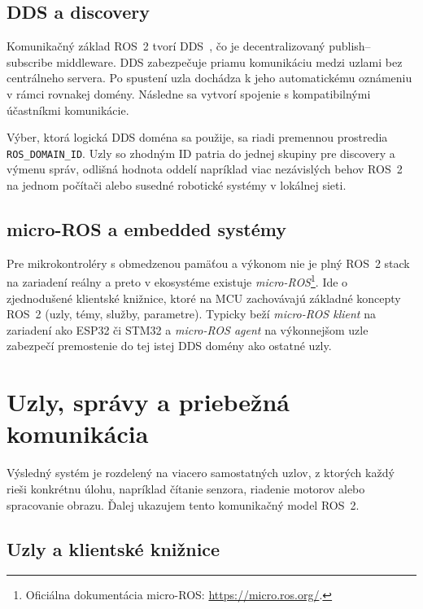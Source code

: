         \subsection*{DDS a discovery}
      
        Komunikačný základ ROS~2 tvorí DDS~\cite{dds_foundation_what_is_dds}, čo je decentralizovaný publish--subscribe middleware. DDS zabezpečuje priamu komunikáciu medzi uzlami bez centrálneho servera. Po spustení uzla dochádza k jeho automatickému oznámeniu v rámci rovnakej domény. Následne sa vytvorí spojenie s kompatibilnými účastníkmi komunikácie.
      
        Výber, ktorá logická DDS doména sa použije, sa riadi premennou prostredia \texttt{ROS\_DOMAIN\_ID}. Uzly so zhodným ID patria do jednej skupiny pre discovery a výmenu správ, odlišná hodnota oddelí napríklad viac nezávislých behov ROS~2 na jednom počítači alebo susedné robotické systémy v lokálnej sieti.
      
        \subsection*{micro-ROS a embedded systémy}
      

        Pre mikrokontroléry s obmedzenou pamäťou a výkonom nie je plný ROS~2 stack na zariadení reálny a preto v ekosystéme existuje \emph{micro-ROS}\footnote{Oficiálna dokumentácia micro-ROS: \url{https://micro.ros.org/}.}. Ide o zjednodušené klientské knižnice, ktoré na MCU zachovávajú základné koncepty ROS~2 (uzly, témy, služby, parametre). Typicky beží \emph{micro-ROS klient} na zariadení ako ESP32 či STM32 a \emph{micro-ROS agent} na výkonnejšom uzle zabezpečí premostenie do tej istej DDS domény ako ostatné uzly.
      
        \section{Uzly, správy a priebežná komunikácia}
      
        Výsledný systém je rozdelený na viacero samostatných uzlov, z ktorých každý rieši konkrétnu úlohu, napríklad čítanie senzora, riadenie motorov alebo spracovanie obrazu. Ďalej ukazujem tento komunikačný model ROS~2.
      
        \subsection*{Uzly a klientské knižnice}
      
